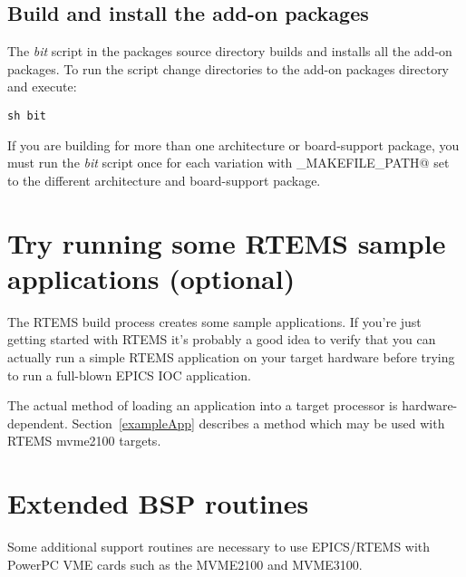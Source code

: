 \documentclass{report}
\begin{document}
\subsection{Build and install the add-on packages}
The {\it bit} script in the packages source directory builds and installs all the add-on packages.  To run
the script change directories to the add-on packages directory and execute:
\begin{verbatim}
sh bit
\end{verbatim}

If you are building for more than one architecture or board-support package, you must run the {\it bit} script once
for each variation with \verb@RTEMS_MAKEFILE_PATH@ set to the different architecture and board-support package.

\section{Try running some RTEMS sample applications (optional)}
The RTEMS build process creates some sample applications.  If you're just getting started with RTEMS it's probably
a good idea to verify that you can actually run a simple RTEMS application on your target hardware before trying to
run a full-blown EPICS IOC application.

The actual method of loading an application into a target processor is
hardware-dependent.  Section~\ref{exampleApp} describes a method which
may be used with RTEMS mvme2100 targets.

\section{Extended BSP routines}
Some additional support routines are necessary to
use EPICS/RTEMS with PowerPC VME cards such as the MVME2100 and MVME3100.
\end{document}
